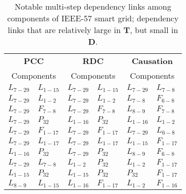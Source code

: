\begin{table}[H]
\centering
\caption{Notable multi-step dependency links among components of IEEE-57 smart grid; dependency links that are relatively large in $\mathbf{T}$, but small in $\mathbf{D}$.}
\label{tab:t_ieee57}
\footnotesize
\begin{tabular}{l@{ - }l|l@{ - }l|l@{ - }l}
\multicolumn{2}{c}{\textbf{PCC}} & \multicolumn{2}{c}{\textbf{RDC}} & \multicolumn{2}{c}{\textbf{Causation}} \\
\multicolumn{2}{c|}{Components} & \multicolumn{2}{c|}{Components} & \multicolumn{2}{c}{Components} \\ \hline
$L_{7-29}$ & $L_{1-15}$ & $L_{7-29}$ & $L_{1-15}$ & $L_{7-29}$ & $L_{7-8}$ \\
$L_{7-29}$ & $L_{1-2}$ & $L_{7-29}$ & $L_{1-2}$ & $L_{7-8}$ & $F_{6-8}$ \\
$L_{7-29}$ & $F_{7-8}$ & $L_{7-29}$ & $F_{7-8}$ & $L_{8-9}$ & $F_{7-8}$ \\
$L_{7-29}$ & $P_{32}$ & $L_{1-16}$ & $P_{32}$ & $L_{1-16}$ & $L_{1-2}$ \\
$L_{7-29}$ & $F_{1-17}$ & $L_{7-29}$ & $F_{1-17}$ & $L_{7-29}$ & $L_{6-8}$ \\
$L_{7-29}$ & $L_{1-17}$ & $L_{7-29}$ & $L_{1-17}$ & $L_{1-15}$ & $F_{1-17}$ \\
$L_{1-16}$ & $P_{32}$ & $L_{7-29}$ & $P_{32}$ & $L_{8-9}$ & $F_{6-8}$ \\
$L_{7-29}$ & $L_{7-8}$ & $L_{1-2}$ & $P_{32}$ & $L_{1-2}$ & $F_{1-17}$ \\
$L_{1-15}$ & $P_{32}$ & $L_{1-15}$ & $P_{32}$ & $P_{32}$ & $F_{1-17}$ \\
$L_{8-9}$ & $L_{1-15}$ & $L_{1-16}$ & $F_{1-17}$ & $L_{1-2}$ & $F_{1-16}$
\end{tabular}
\end{table} 